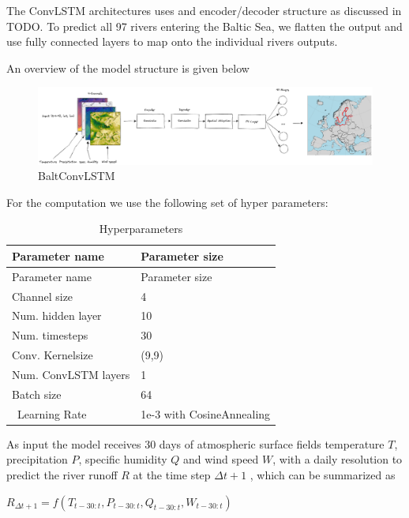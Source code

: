 \documentclass[
]{agujournal2019}
\begin{document}
The ConvLSTM architectures uses and encoder/decoder structure as
discussed in TODO. To predict all 97 rivers entering the Baltic Sea, we
flatten the output and use fully connected layers to map onto the
individual rivers outputs.

An overview of the model structure is given below

\begin{figure}

{\centering \includegraphics{model_structure.png}

}

\caption{\label{fig-baltNet}BaltConvLSTM}

\end{figure}

For the computation we use the following set of hyper parameters:

\hypertarget{tbl-letters}{}
\begin{longtable}[]{@{}ll@{}}
\caption{\label{tbl-letters}Hyperparameters}\tabularnewline
\toprule()
Parameter name & Parameter size \\
\midrule()
\endfirsthead
\toprule()
Parameter name & Parameter size \\
\midrule()
\endhead
Channel size & 4 \\
Num. hidden layer & 10 \\
Num. timesteps & 30 \\
Conv. Kernelsize & (9,9) \\
Num. ConvLSTM layers & 1 \\
Batch size & 64 \\
~Learning Rate & 1e-3 with CosineAnnealing \\
\bottomrule()
\end{longtable}

As input the model receives 30 days of atmospheric surface fields
temperature \(T\), precipitation \(P\), specific humidity \(Q\) and wind
speed \(W\), with a daily resolution to predict the river runoff \(R\)
at the time step \(\Delta t+1\) , which can be summarized as

\(R_{\Delta t+1} = f\left(T_{t-30:t}, P_{t-30:t}, Q_{t-30:t}, W_{t-30:t}\right)\)
\end{document}
